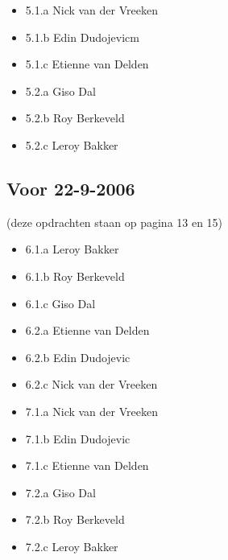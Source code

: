 \documentclass{article}
\begin{document}
\begin{itemize}
\item 5.1.a Nick van der Vreeken
\item 5.1.b Edin Dudojevicm
\item 5.1.c Etienne van Delden
\item 5.2.a Giso Dal
\item 5.2.b Roy Berkeveld
\item 5.2.c Leroy Bakker
\end{itemize}


\subsection{Voor 22-9-2006}
(deze opdrachten staan op pagina 13 en 15)

\begin{itemize}
\item 6.1.a Leroy Bakker
\item 6.1.b Roy Berkeveld
\item 6.1.c Giso Dal
\item 6.2.a Etienne van Delden
\item 6.2.b Edin Dudojevic
\item 6.2.c Nick van der Vreeken
\end{itemize}

\begin{itemize}
\item 7.1.a Nick van der Vreeken
\item 7.1.b Edin Dudojevic
\item 7.1.c Etienne van Delden
\item 7.2.a Giso Dal
\item 7.2.b Roy Berkeveld
\item 7.2.c Leroy Bakker
\end{itemize}
\end{document}
